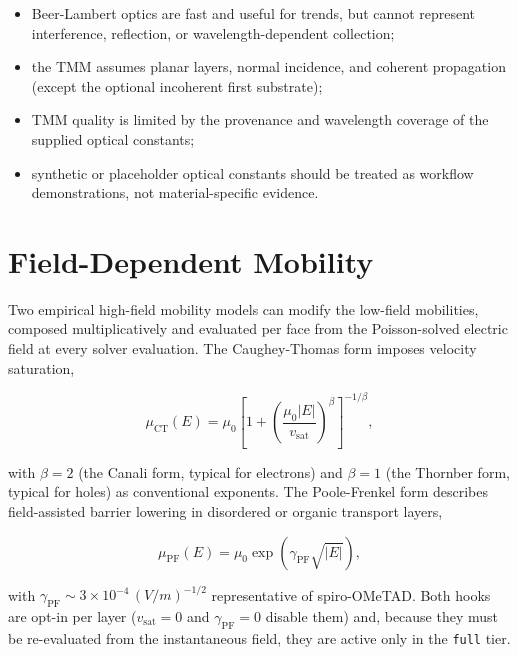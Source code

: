 \documentclass[
  11pt,
  american,
]{report}
\providecommand{\tightlist}{%
  \setlength{\itemsep}{0pt}\setlength{\parskip}{0pt}}
\begin{document}
\begin{itemize}
\tightlist
\item
  Beer-Lambert optics are fast and useful for trends, but cannot
  represent interference, reflection, or wavelength-dependent
  collection;
\item
  the TMM assumes planar layers, normal incidence, and coherent
  propagation (except the optional incoherent first substrate);
\item
  TMM quality is limited by the provenance and wavelength coverage of
  the supplied optical constants;
\item
  synthetic or placeholder optical constants should be treated as
  workflow demonstrations, not material-specific evidence.
\end{itemize}

\hypertarget{field-dependent-mobility}{%
\section{Field-Dependent Mobility}\label{field-dependent-mobility}}

Two empirical high-field mobility models can modify the low-field
mobilities, composed multiplicatively and evaluated per face from the
Poisson-solved electric field at every solver evaluation. The
Caughey-Thomas form imposes velocity saturation,

\begin{equation}
\label{eq:caughey-thomas}
\mu_\mathrm{CT}(E)
=
\mu_0\left[1+\left(\frac{\mu_0 |E|}{v_\mathrm{sat}}\right)^{\beta}
\right]^{-1/\beta},
\end{equation}

with \(\beta = 2\) (the Canali form, typical for electrons) and
\(\beta = 1\) (the Thornber form, typical for holes) as conventional
exponents. The Poole-Frenkel form describes field-assisted barrier
lowering in disordered or organic transport layers,

\begin{equation}
\label{eq:poole-frenkel}
\mu_\mathrm{PF}(E)
=
\mu_0 \exp\!\left(\gamma_\mathrm{PF}\sqrt{|E|}\right),
\end{equation}

with \(\gamma_\mathrm{PF} \sim 3\times10^{-4}\,(V/m)^{-1/2}\)
representative of spiro-OMeTAD. Both hooks are opt-in per layer
(\(v_\mathrm{sat} = 0\) and \(\gamma_\mathrm{PF} = 0\) disable them)
and, because they must be re-evaluated from the instantaneous field,
they are active only in the \texttt{full} tier.
\end{document}
